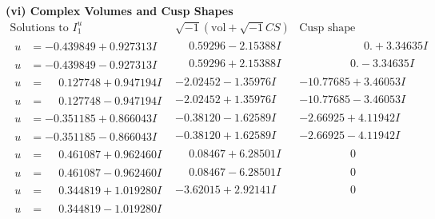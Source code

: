 \documentclass[1p]{elsarticle_modified}
\theoremstyle{definition}
\newcommand{\I}{\sqrt{-1}}
\begin{document}
\newpage\flushleft \textbf{(vi) Complex Volumes and Cusp Shapes}
$$\begin{array}{c|c|c}  
\text{Solutions to }I^u_{1}& \I (\text{vol} + \sqrt{-1}CS) & \text{Cusp shape}\\
 \hline 
\begin{aligned}
u &= -0.439849 + 0.927313 I\end{aligned}
 & \phantom{-}0.59296 - 2.15388 I & \phantom{-0.000000 -}0. + 3.34635 I \\ \hline\begin{aligned}
u &= -0.439849 - 0.927313 I\end{aligned}
 & \phantom{-}0.59296 + 2.15388 I & \phantom{-0.000000 } 0. - 3.34635 I \\ \hline\begin{aligned}
u &= \phantom{-}0.127748 + 0.947194 I\end{aligned}
 & -2.02452 - 1.35976 I & -10.77685 + 3.46053 I \\ \hline\begin{aligned}
u &= \phantom{-}0.127748 - 0.947194 I\end{aligned}
 & -2.02452 + 1.35976 I & -10.77685 - 3.46053 I \\ \hline\begin{aligned}
u &= -0.351185 + 0.866043 I\end{aligned}
 & -0.38120 - 1.62589 I & -2.66925 + 4.11942 I \\ \hline\begin{aligned}
u &= -0.351185 - 0.866043 I\end{aligned}
 & -0.38120 + 1.62589 I & -2.66925 - 4.11942 I \\ \hline\begin{aligned}
u &= \phantom{-}0.461087 + 0.962460 I\end{aligned}
 & \phantom{-}0.08467 + 6.28501 I & \phantom{-0.000000 } 0 \\ \hline\begin{aligned}
u &= \phantom{-}0.461087 - 0.962460 I\end{aligned}
 & \phantom{-}0.08467 - 6.28501 I & \phantom{-0.000000 } 0 \\ \hline\begin{aligned}
u &= \phantom{-}0.344819 + 1.019280 I\end{aligned}
 & -3.62015 + 2.92141 I & \phantom{-0.000000 } 0 \\ \hline\begin{aligned}
u &= \phantom{-}0.344819 - 1.019280 I\end{aligned}

\end{array}$$
\end{document}
